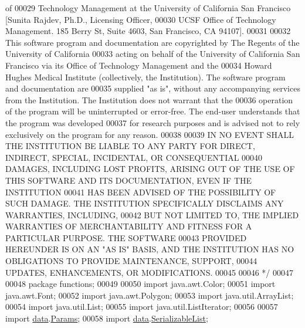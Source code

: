 \begin{DoxyCode}
{       of }
00029 \textcolor{comment}{Technology Management at the University of California San Francisco [Sunita Rajdev, Ph.D., Licensing
       Officer, }
00030 \textcolor{comment}{UCSF Office of Technology Management. 185 Berry St, Suite 4603, San Francisco, CA 94107].}
00031 \textcolor{comment}{}
00032 \textcolor{comment}{This software program and documentation are copyrighted by The Regents of the University of California }
00033 \textcolor{comment}{acting on behalf of the University of California San Francisco via its Office of Technology Management and
       the }
00034 \textcolor{comment}{Howard Hughes Medical Institute (collectively, the Institution).  The software program and documentation
       are }
00035 \textcolor{comment}{supplied "as is", without any accompanying services from the Institution. The Institution does not warrant
       that the }
00036 \textcolor{comment}{operation of the program will be uninterrupted or error-free. The end-user understands that the program was
       developed }
00037 \textcolor{comment}{for research purposes and is advised not to rely exclusively on the program for any reason.}
00038 \textcolor{comment}{}
00039 \textcolor{comment}{IN NO EVENT SHALL THE INSTITUTION BE LIABLE TO ANY PARTY FOR DIRECT, INDIRECT, SPECIAL, INCIDENTAL, OR
       CONSEQUENTIAL }
00040 \textcolor{comment}{DAMAGES, INCLUDING LOST PROFITS, ARISING OUT OF THE USE OF THIS SOFTWARE AND ITS DOCUMENTATION, EVEN IF THE
       INSTITUTION }
00041 \textcolor{comment}{HAS BEEN ADVISED OF THE POSSIBILITY OF SUCH DAMAGE. THE  INSTITUTION SPECIFICALLY DISCLAIMS ANY WARRANTIES,
       INCLUDING, }
00042 \textcolor{comment}{BUT NOT LIMITED TO, THE IMPLIED WARRANTIES OF MERCHANTABILITY AND FITNESS FOR A PARTICULAR PURPOSE. THE
       SOFTWARE }
00043 \textcolor{comment}{PROVIDED HEREUNDER IS ON AN "AS IS" BASIS, AND THE  INSTITUTION HAS NO OBLIGATIONS TO PROVIDE MAINTENANCE,
       SUPPORT, }
00044 \textcolor{comment}{UPDATES, ENHANCEMENTS, OR MODIFICATIONS.}
00045 \textcolor{comment}{}
00046 \textcolor{comment}{*/}    
00047 
00048 \textcolor{keyword}{package }functions;
00049 
00050 \textcolor{keyword}{import} java.awt.Color;
00051 \textcolor{keyword}{import} java.awt.Font;
00052 \textcolor{keyword}{import} java.awt.Polygon;
00053 \textcolor{keyword}{import} java.util.ArrayList;
00054 \textcolor{keyword}{import} java.util.List;
00055 \textcolor{keyword}{import} java.util.ListIterator;
00056 
00057 \textcolor{keyword}{import} \hyperlink{namespacedata}{data}.\hyperlink{classdata_1_1_params}{Params};
00058 \textcolor{keyword}{import} \hyperlink{namespacedata}{data}.\hyperlink{classdata_1_1_serializable_list}{SerializableList};

\end{DoxyCode}
